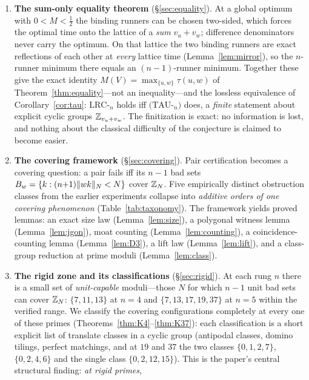 \begin{enumerate}[leftmargin=1.6em,itemsep=2pt]
\item \textbf{The sum-only equality theorem}
  (\S\ref{sec:equality}). At a global optimum with $0<M<\tfrac12$ the
  binding runners can be chosen two-sided, which forces the optimal time
  onto the lattice of a \emph{sum} $v_u+v_w$; difference denominators never
  carry the optimum. On that lattice the two binding runners are exact
  reflections of each other at \emph{every} lattice time
  (Lemma~\ref{lem:mirror}), so the $n$-runner minimum there equals an
  $(n{-}1)$-runner minimum. Together these give the exact identity
  $M(V)=\max_{\{u,w\}}\tau(u,w)$ of Theorem~\ref{thm:equality}---not an
  inequality---and the lossless equivalence of
  Corollary~\ref{cor:tau}: $\mathrm{LRC}$-$_n$ holds iff
  $(\mathrm{TAU}$-$_n)$ does, a \emph{finite} statement about explicit
  cyclic groups $\mathbb{Z}_{v_u+v_w}$. The finitization is exact: no information
  is lost, and nothing about the classical difficulty of the conjecture is
  claimed to become easier.
\item \textbf{The covering framework} (\S\ref{sec:covering}). Pair
  certification becomes a covering question: a pair fails iff its $n-1$ bad
  sets $B_w=\{k : (n{+}1)\lVert wk \rVert_{N}<N\}$ cover $\mathbb{Z}_N$. Five empirically
  distinct obstruction classes from the earlier experiments
  collapse into \emph{additive orders of one covering phenomenon}
  (Table~\ref{tab:taxonomy}). The framework yields proved lemmas: an exact
  size law (Lemma~\ref{lem:size}), a polygonal witness lemma
  (Lemma~\ref{lem:jgon}), moat counting (Lemma~\ref{lem:counting}), a
  coincidence-counting lemma (Lemma~\ref{lem:D3}), a lift law
  (Lemma~\ref{lem:lift}), and a class-group reduction at prime moduli
  (Lemma~\ref{lem:class}).
\item \textbf{The rigid zone and its classifications}
  (\S\ref{sec:rigid}). At each rung $n$ there is a small set of
  \emph{unit-capable} moduli---those $N$ for which $n-1$ unit bad sets can
  cover $\mathbb{Z}_N$: $\{7,11,13\}$ at $n=4$ and $\{7,13,17,19,37\}$ at $n=5$
  within the verified range. We classify the covering configurations
  completely at every one of these primes
  (Theorems~\ref{thm:K4}--\ref{thm:K37}): each classification is a short
  explicit list of translate classes in a cyclic group (antipodal classes,
  domino tilings, perfect matchings, and at $19$ and $37$ the two classes
  $\{0,1,2,7\}$, $\{0,2,4,6\}$ and the single class $\{0,2,12,15\}$).
  This is the paper's central structural finding: \emph{at rigid primes,
}
\end{enumerate}

